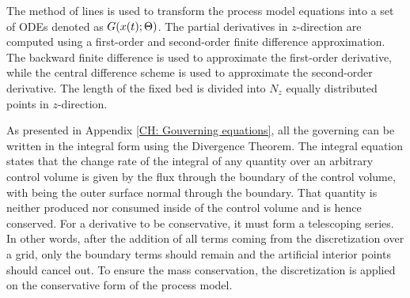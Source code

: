 \documentclass[../Article_Model_Parameters.tex]{subfiles}
\begin{document}
			The method of lines is used to transform the process model equations into a set of ODEs denoted as ${\color{black}G}({\color{black}x}(t);{\color{black}\Theta})$. The partial derivatives in $z$-direction are computed using a first-order and second-order finite difference approximation. The backward finite difference is used to approximate the first-order derivative, while the central difference scheme is used to approximate the second-order derivative. The length of the fixed bed is divided into $N_z$ equally distributed points in $z$-direction. 
			
			As presented in Appendix \ref{CH: Gouverning equations}, all the governing can be written in the integral form using the Divergence Theorem. The integral equation states that the change rate of the integral of any quantity over an arbitrary control volume is given by the flux through the boundary of the control volume, with being the outer surface normal through the boundary. That quantity is neither produced nor consumed inside of the control volume and is hence conserved. For a derivative to be conservative, it must form a telescoping series. In other words, after the addition of all terms coming from the discretization over a grid, only the boundary terms should remain and the artificial interior points should cancel out. To ensure the mass conservation, the discretization is applied on the conservative form of the process model.
			
%			
%			
			
\end{document}
